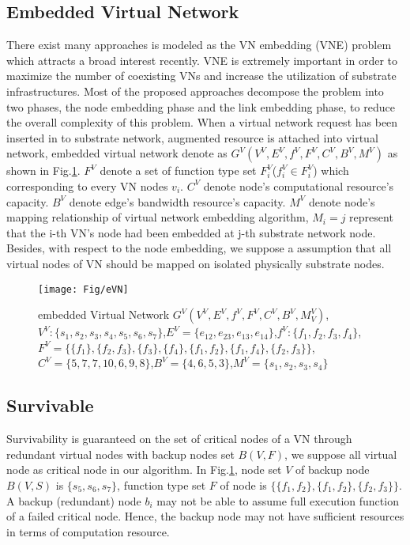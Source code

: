 \subsection{Embedded Virtual Network}
\label{sec:embeddedVirtualNetwork}
There exist many approaches is modeled as the VN embedding (VNE) problem which attracts a broad interest recently\cite{fischer2013virtual}. VNE is extremely important in order to maximize the number of coexisting VNs and increase the utilization of substrate infrastructures. Most of the proposed approaches decompose the problem into two phases, the node embedding phase and the link embedding phase, to reduce the overall complexity of this problem. When a virtual network request has been inserted in to substrate network, augmented resource is attached into virtual network, embedded virtual network denote as $G^V (V^V,E^V,f^V,F^V,C^V,B^V,M^V)$ as shown in Fig.\ref{fig:eVN}. $F^V$ denote a set of function type set $F^V_i$($f^V_i\in F^V_i$) which corresponding to every VN nodes $v_i$. $C^V$ denote node's computational resource's capacity. $B^V$ denote edge's bandwidth resource's capacity. $M^V$ denote node's mapping relationship of virtual network embedding algorithm, $M_{i}=j$ represent that the i-th VN's node had been embedded at j-th substrate network node. Besides, with respect to the node embedding, we suppose a assumption that all virtual nodes of VN should be mapped on isolated physically substrate nodes.
\begin{figure}
\centering
\texttt{[image: Fig/eVN]}\\
\caption{embedded Virtual Network $G^V (V^V,E^V,f^V,F^V,C^V,B^V,M^V_V)$,$V^V:\{s_1,s_2,s_3,s_4,s_5,s_6,s_7\}$,$E^V=\{e_{12},e_{23},e_{13},e_{14}\}$,$f^V:\{f_1,f_2,f_3,f_4\}$,
$F^V=\{\{f_1\},\{f_2,f_3\},\{f_3\},\{f_4\},\{f_1,f_2\},\{f_1,f_4\},\{f_2,f_3\}\}$,$C^V=\{5,7,7,10,6,9,8\}$,$B^V=\{4,6,5,3\}$,$M^V=\{s_1,s_2,s_3,s_4\}$}\label{fig:eVN}
\end{figure}

\subsection{Survivable}

Survivability is guaranteed on the set of critical nodes of a VN through redundant virtual nodes with backup nodes set $B(V,F)$, we suppose all virtual node as critical node in our algorithm. In Fig.\ref{fig:eVN}, node set $V$ of backup node $B(V,S)$ is $\{s_5,s_6,s_7\}$, function type set $F$ of node is $\{\{f_1,f_2\},\{f_1,f_2\},\{f_2,f_3\}\}$. A backup (redundant) node $b_i$ may not be able to assume full execution function of a failed critical node. Hence, the backup node may not have sufficient resources in terms of computation resource.


